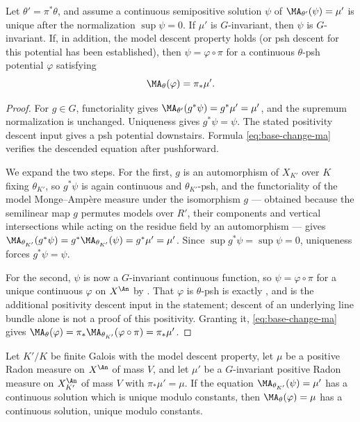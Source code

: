 \begin{proposition}\label{prop:galois-descent-potentials}
Let $\theta'=\pi^*\theta$, and assume a continuous semipositive solution
$\psi$ of
$\MA_{\theta'}(\psi)=\mu'$ is unique after the normalization
$\sup\psi=0$.  If $\mu'$ is $G$-invariant, then $\psi$ is
$G$-invariant.  If, in addition, the model descent property holds (or psh descent for
this potential has been established), then $\psi=\varphi\circ\pi$
for a continuous $\theta$-psh potential $\varphi$ satisfying
\[
                       \MA_\theta(\varphi)=\pi_*\mu'.
\]
\end{proposition}

\begin{proof}
For $g\in G$, functoriality gives
$\MA_{\theta'}(g^*\psi)=g^*\mu'=\mu'$, and the supremum normalization is
unchanged.  Uniqueness gives $g^*\psi=\psi$.  The stated positivity descent input gives a psh potential downstairs.
Formula \eqref{eq:base-change-ma} verifies
the descended equation after pushforward.

We expand the two steps.  For the first, $g$ is an automorphism of
$X_{K'}$ over $K$ fixing $\theta_{K'}$, so $g^*\psi$ is again
continuous and $\theta_{K'}$-psh, and the functoriality of the model
Monge--Amp\`ere measure under the isomorphism $g$ --- obtained because the semilinear map $g$ permutes models over
$R'$, their components and vertical intersections while acting on the
residue field by an automorphism --- gives
$\MA_{\theta_{K'}}(g^*\psi)=g^*\MA_{\theta_{K'}}(\psi)=g^*\mu'=\mu'$.
Since $\sup g^*\psi=\sup\psi=0$, uniqueness forces $g^*\psi=\psi$.

For the second, $\psi$ is now a $G$-invariant continuous function, so
$\psi=\varphi\circ\pi$ for a unique continuous $\varphi$ on $X^{\An}$
by .  That $\varphi$ is
$\theta$-psh is exactly , and is the
additional positivity descent input in the statement; descent of an
underlying line bundle alone is not a proof of this positivity.
Granting it, \eqref{eq:base-change-ma} gives
$\MA_\theta(\varphi)=\pi_*\MA_{\theta_{K'}}(\varphi\circ\pi)
=\pi_*\mu'$.
\end{proof}

\begin{corollary}
\label{cor:ch30-descent-cy}
Let $K'/K$ be finite Galois with the model descent property, let $\mu$
be a positive Radon measure on $X^{\An}$ of mass $V$, and let $\mu'$
be a $G$-invariant positive Radon measure on $X_{K'}^{\An}$ of mass
$V$ with $\pi_*\mu'=\mu$.  If the equation
$\MA_{\theta_{K'}}(\psi)=\mu'$ has a continuous solution which is unique
modulo constants, then $\MA_\theta(\varphi)=\mu$ has a continuous
solution, unique modulo constants.
\end{corollary}

